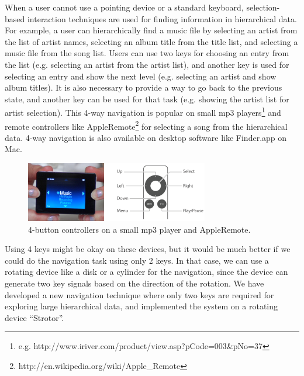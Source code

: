 \documentclass{article}
\begin{document}
When a user cannot use a pointing device or a standard keyboard,
selection-based interaction techniques are used for
finding information in hierarchical data.
For example, a user can hierarchically find a music file by
selecting an artist from the list of artist names,
selecting an album title from the title list,
and selecting a music file from the song list.
Users can use two keys for choosing an entry from the list
(e.g. selecting an artist from the artist list),
and another key is used for selecting an entry and show the next level
(e.g. selecting an artist and show album titles).
It is also necessary to provide a way to go back to the previous state, and
another key can be used for that task
(e.g. showing the artist list for artist selection).
%
This 4-way navigation is popular on small mp3 players\footnote{
  e.g. http://www.iriver.com/product/view.asp?pCode=003\&pNo=37
} and remote controllers like AppleRemote\footnote{http://en.wikipedia.org/wiki/Apple\_Remote}
for selecting a song from the hierarchical data.
4-way navigation is also available on desktop software like Finder.app on Mac.

\begin{figure}[H]
\centerline{\includegraphics[width=80mm,bb=0 0 547 179]{figures/4buttons.png}}
\caption{4-button controllers on a small mp3 player and AppleRemote.}
\label{u10}
\end{figure}



Using 4 keys might be okay on these devices, but it would be much better
if we could do the navigation task using only 2 keys.
In that case, we can use a rotating device like a disk or a cylinder for the navigation,
since the device can generate two key signals based on the direction of the rotation.
%
We have developed a new navigation technique where only two keys are required
for exploring large hierarchical data, and implemented the system on
a rotating device ``Strotor''.
\end{document}
